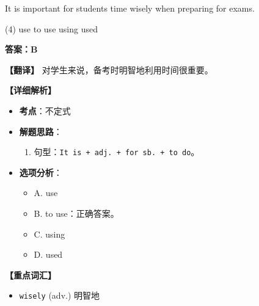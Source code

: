 \documentclass[11pt, a4paper]{article}
\newcommand{\analysis}[4]{
    \begin{solutionbox}
        \textbf{答案：#1}
        
        \textbf{【翻译】} #2
        
        \textbf{【详细解析】}
        #3
        
        \textbf{【重点词汇】}
        #4
    \end{solutionbox}
}
\newcommand{\blank}{\underline{\hspace{1.5cm}}}
\begin{document}
\begin{questions}
    \item It is important for students \blank time wisely when preparing for exams.
    \begin{tasks}(4)
        \task use \task to use \task using \task used
    \end{tasks}
    \analysis{B}{对学生来说，备考时明智地利用时间很重要。}{
        \begin{itemize}
            \item \textbf{考点}：不定式
            \item \textbf{解题思路}：
                \begin{enumerate}
                    \item 句型：\texttt{It is + adj. + for sb. + to do}。
                \end{enumerate}
            \item \textbf{选项分析}：
                \begin{itemize}
                    \item A. use
                    \item B. to use：正确答案。
                    \item C. using
                    \item D. used
                \end{itemize}
        \end{itemize}
    }{
        \begin{itemize}
            \item \texttt{wisely} (adv.) 明智地
        \end{itemize}
    }


\end{questions}
\end{document}
